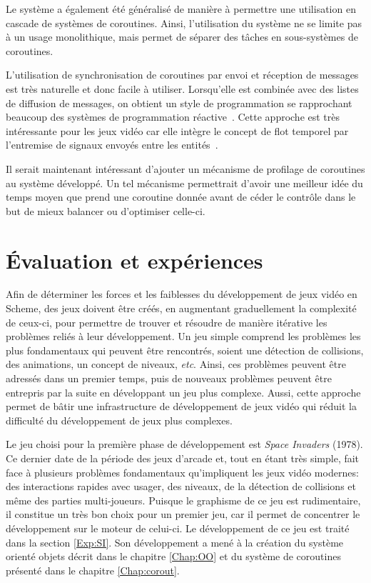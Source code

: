 \documentclass[12pt,twoside,letterpaper,francais]{book}
\begin{document}
Le système a également été généralisé de manière à permettre une
utilisation en cascade de systèmes de coroutines. Ainsi, l'utilisation
du système ne se limite pas à un usage monolithique, mais permet de
séparer des tâches en sous-systèmes de coroutines.

L'utilisation de synchronisation de coroutines par envoi et réception
de messages est très naturelle et donc facile à utiliser. Lorsqu'elle
est combinée avec des listes de diffusion de messages, on obtient un
style de programmation se rapprochant beaucoup des systèmes de
programmation réactive~\cite{FRP}. Cette approche est très
intéressante pour les jeux vidéo car elle intègre le concept de flot
temporel par l'entremise de signaux envoyés entre les
entités~\cite{yampa}.

Il serait maintenant intéressant d'ajouter un mécanisme de profilage
de coroutines au système développé. Un tel mécanisme permettrait
d'avoir une meilleur idée du temps moyen que prend une coroutine
donnée avant de céder le contrôle dans le but de mieux balancer ou
d'optimiser celle-ci.

\clearpage

\chapter{Évaluation et expériences}\label{Chap:exp}
Afin de déterminer les forces et les faiblesses du dévelop\-pement de
jeux vidéo en Scheme, des jeux doivent être créés, en augmentant
graduellement la complexité de ceux-ci, pour permettre de trouver et
résoudre de manière itérative les problèmes reliés à leur
dévelop\-pement. Un jeu simple comprend les problèmes les plus
fondamentaux qui peuvent être rencontrés, soient une détection de
collisions, des animations, un concept de niveaux,
\textit{etc}. Ainsi, ces problèmes peuvent être adressés dans un
premier temps, puis de nouveaux problèmes peuvent être entrepris par
la suite en développant un jeu plus complexe. Aussi, cette approche
permet de bâtir une infrastructure de dévelop\-pement de jeux vidéo
qui réduit la difficulté du dévelop\-pement de jeux plus complexes.

Le jeu choisi pour la première phase de dévelop\-pement est
\textit{Space Invaders} (1978). Ce dernier date de la période des jeux
d'arcade et, tout en étant très simple, fait face à plusieurs
problèmes fondamentaux qu'impliquent les jeux vidéo modernes: des
interactions rapides avec usager, des niveaux, de la détection de
collisions et même des parties multi-joueurs. Puisque le graphisme de
ce jeu est rudimentaire, il constitue un très bon choix pour un
premier jeu, car il permet de concentrer le dévelop\-pement sur le
moteur de celui-ci. Le dévelop\-pement de ce jeu est traité dans la
section \ref{Exp:SI}. Son dévelop\-pement a mené à la création du
système orienté objets décrit dans le chapitre \ref{Chap:OO} et du
système de coroutines présenté dans le chapitre \ref{Chap:corout}.
\end{document}
